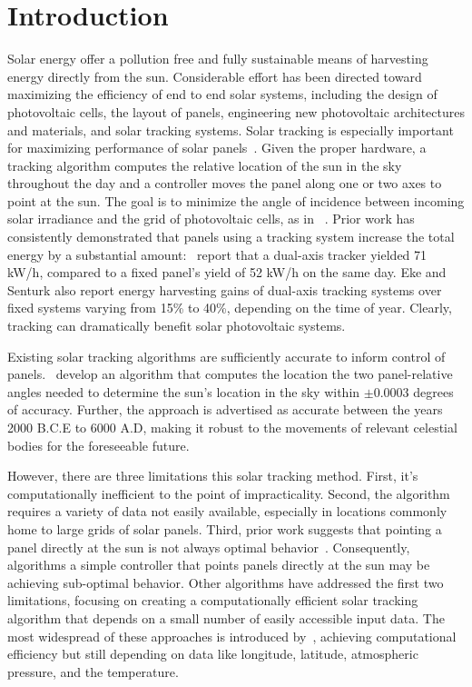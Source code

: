 \documentclass[11pt]{article}
\begin{document}
\section{Introduction}
Solar energy offer a pollution free and fully sustainable means of harvesting energy directly from the sun. Considerable effort has been directed toward maximizing the efficiency of end to end solar systems, including the design of photovoltaic cells, the layout of panels, engineering new photovoltaic architectures and materials, and solar tracking systems. Solar tracking is especially important for maximizing performance of solar panels~\cite{Eke2012,Rizk2008,King2001}. Given the proper hardware, a tracking algorithm computes the relative location of the sun in the sky throughout the day and a controller moves the panel along one or two axes to point at the sun. The goal is to minimize the angle of incidence between incoming solar irradiance and the grid of photovoltaic cells, as in ~\citet{Eke2012,Benghanem2011,King2001, kalogirou1996design}. Prior work has consistently demonstrated that panels using a tracking system increase the total energy by a substantial amount:~\citet{Eke2012} report that a dual-axis tracker yielded 71 kW/h, compared to a fixed panel's yield of 52 kW/h on the same day. Eke and Senturk also report energy harvesting gains of dual-axis tracking systems over fixed systems varying from 15\% to 40\%, depending on the time of year. Clearly, tracking can dramatically benefit solar photovoltaic systems.

Existing solar tracking algorithms are sufficiently accurate to inform control of panels.~\citet{reda2004solar} develop an algorithm that computes the location the two panel-relative angles needed to determine the sun's location in the sky within $\pm 0.0003$ degrees of accuracy. Further, the approach is advertised as accurate between the years 2000 B.C.E to 6000 A.D, making it robust to the movements of relevant celestial bodies for the foreseeable future.

However, there are three limitations this solar tracking method. First, it's computationally inefficient to the point of impracticality. Second, the algorithm requires a variety of data not easily available, especially in locations commonly home to large grids of solar panels. Third, prior work suggests that pointing a panel directly at the sun is not always optimal behavior~\citet{Kelly2009,Hussein1995,King2001}. Consequently, algorithms a simple controller that points panels directly at the sun may be achieving sub-optimal behavior. Other algorithms have addressed the first two limitations, focusing on creating a computationally efficient solar tracking algorithm that depends on a small number of easily accessible input data. The most widespread of these approaches is introduced by~\citet{Grena2008}, achieving computational efficiency but still depending on data like longitude, latitude, atmospheric pressure, and the temperature. \\ 
\end{document}

